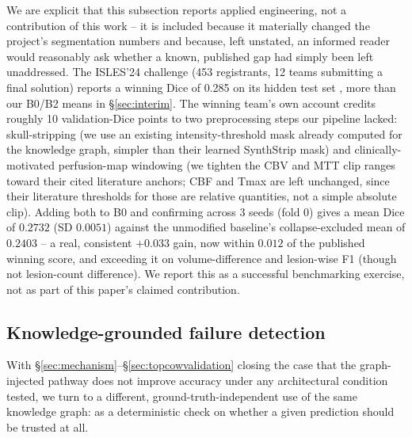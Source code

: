 \documentclass[conference]{IEEEtran}
\begin{document}
We are explicit that this subsection reports applied engineering, not a contribution of this work -- it is included because it materially changed the project's segmentation numbers and because, left unstated, an informed reader would reasonably ask whether a known, published gap had simply been left unaddressed. The ISLES'24 challenge (453 registrants, 12 teams submitting a final solution) reports a winning Dice of 0.285 on its hidden test set \cite{kurtlab2026}, more than our B0/B2 means in \S\ref{sec:interim}. The winning team's own account credits roughly 10 validation-Dice points to two preprocessing steps our pipeline lacked: skull-stripping (we use an existing intensity-threshold mask already computed for the knowledge graph, simpler than their learned SynthStrip mask) and clinically-motivated perfusion-map windowing (we tighten the CBV and MTT clip ranges toward their cited literature anchors; CBF and Tmax are left unchanged, since their literature thresholds for those are relative quantities, not a simple absolute clip). Adding both to B0 and confirming across 3 seeds (fold 0) gives a mean Dice of $0.2732$ (SD $0.0051$) against the unmodified baseline's collapse-excluded mean of $0.2403$ -- a real, consistent $+0.033$ gain, now within $0.012$ of the published winning score, and exceeding it on volume-difference and lesion-wise F1 (though not lesion-count difference). We report this as a successful benchmarking exercise, not as part of this paper's claimed contribution.

\subsection{Knowledge-grounded failure detection}
\label{sec:faildetect}

With \S\ref{sec:mechanism}--\S\ref{sec:topcowvalidation} closing the case that the graph-injected pathway does not improve accuracy under any architectural condition tested, we turn to a different, ground-truth-independent use of the same knowledge graph: as a deterministic check on whether a given prediction should be trusted at all.
\end{document}
